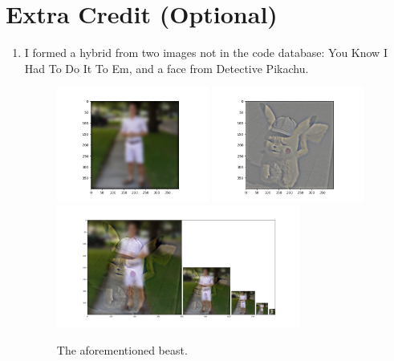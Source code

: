 \section*{Extra Credit (Optional)}
\begin{enumerate}
   
    \item I formed a hybrid from two images not in the code database: You Know I Had To Do It To Em, and a face from Detective Pikachu.
        
    \begin{figure}[h]
        \centering
        \includegraphics[width=5cm]{lowpassDoit.png}
        \includegraphics[width=5cm]{highpassPika.png}
        \includegraphics[width=8cm]{splitPika.png}
        \caption{The aforementioned beast.}
        \label{fig:result4}
    \end{figure}

\end{enumerate}



